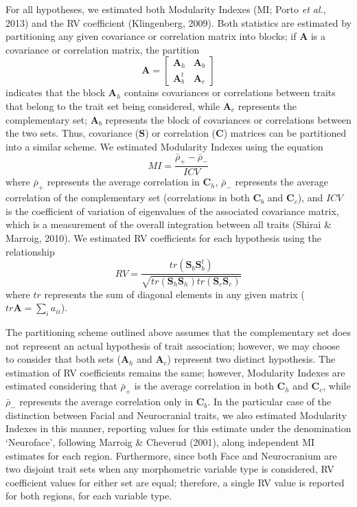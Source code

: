 \documentclass[12pt,]{article}
\begin{document}
For all hypotheses, we estimated both Modularity Indexes (MI; Porto
\emph{et al.}, 2013) and the RV coefficient (Klingenberg, 2009). Both
statistics are estimated by partitioning any given covariance or
correlation matrix into blocks; if $\mathbf{A}$ is a covariance or
correlation matrix, the partition \[
\mathbf{A} =
\begin{bmatrix}
\mathbf{A}_h & \mathbf{A}_b \\
\mathbf{A}^t_b & \mathbf{A}_c
\end{bmatrix}
\] indicates that the block $\mathbf{A}_h$ contains covariances or
correlations between traits that belong to the trait set being
considered, while $\mathbf{A}_c$ represents the complementary set;
$\mathbf{A}_b$ represents the block of covariances or correlations
between the two sets. Thus, covariance ($\mathbf{S}$) or correlation
($\mathbf{C}$) matrices can be partitioned into a similar scheme. We
estimated Modularity Indexes using the equation \[
MI = \frac {\bar{\rho}_{+} - \bar{\rho}_{-}} {ICV}
\] where $\bar{\rho}_{+}$ represents the average correlation in
$\mathbf{C}_h$, $\bar{\rho}_{-}$ represents the average correlation of
the complementary set (correlations in both $\mathbf{C}_b$ and
$\mathbf{C}_c$), and $ICV$ is the coefficient of variation of
eigenvalues of the associated covariance matrix, which is a measurement
of the overall integration between all traits (Shirai \& Marroig, 2010).
We estimated RV coefficients for each hypothesis using the relationship
\[
RV = \frac{tr(\mathbf{S}_{b}\mathbf{S}^t_{b})}{\sqrt{tr(\mathbf{S}_h \mathbf{S}_h)tr(\mathbf{S}_c \mathbf{S}_c)}}
\] where $tr$ represents the sum of diagonal elements in any given
matrix ($tr \mathbf{A} = \sum_i a_{ii}$).

The partitioning scheme outlined above assumes that the complementary
set does not represent an actual hypothesis of trait association;
however, we may choose to consider that both sets ($\mathbf{A}_h$ and
$\mathbf{A}_c$) represent two distinct hypothesis. The estimation of RV
coefficients remains the same; however, Modularity Indexes are estimated
considering that $\bar{\rho}_{+}$ is the average correlation in both
$\mathbf{C}_h$ and $\mathbf{C}_c$, while $\bar{\rho}_{-}$ represents the
average correlation only in $\mathbf{C}_b$. In the particular case of
the distinction between Facial and Neurocranial traits, we also
estimated Modularity Indexes in this manner, reporting values for this
estimate under the denomination `Neuroface', following Marroig \&
Cheverud (2001), along independent MI estimates for each region.
Furthermore, since both Face and Neurocranium are two disjoint trait
sets when any morphometric variable type is considered, RV coefficient
values for either set are equal; therefore, a single RV value is
reported for both regions, for each variable type.
\end{document}
